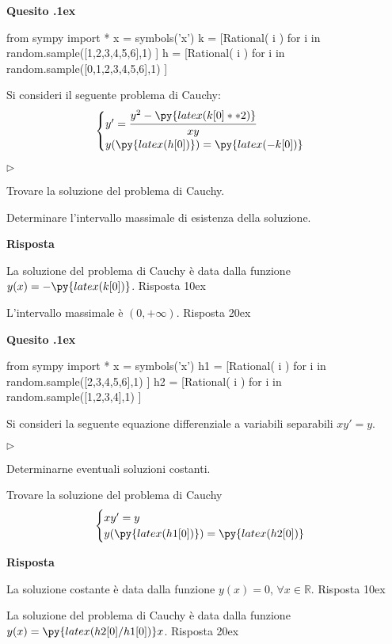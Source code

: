 \documentclass[11pt,twoside,a4paper]{article}
\newcommand{\mylabel}[1]{#1\hfill}
\renewenvironment{itemize}
  {\begin{list}{$\triangleright$}{%
   \setlength{\parskip}{0mm}
   \setlength{\topsep}{.4\baselineskip}
   \setlength{\rightmargin}{0mm}
   \setlength{\listparindent}{0mm}
   \setlength{\itemindent}{0mm}
   \setlength{\labelwidth}{2ex}
   \setlength{\itemsep}{.4\baselineskip}
   \setlength{\parsep}{0mm}
   \setlength{\partopsep}{0mm}
   \setlength{\labelsep}{1ex}
   \setlength{\leftmargin}{\labelwidth+\labelsep}
   \let\makelabel\mylabel}}{%
   \end{list}\vspace*{-1.3mm}}
\newcounter{quesito}
\newenvironment{question}{\bigskip\addtocounter{quesito}{1}\bigskip\bigskip\par\textbf{Quesito \thequesito.\kern1ex}}{\vspace{\parskip}}
\newenvironment{answer}{\par\textbf{Risposta\quad}}{\vspace{\parskip}}
\begin{document}
\begin{question}
\def\RR{{\mathds R}}
\begin{pycode}
from sympy import *
x = symbols('x')
k = [Rational( i ) for i in random.sample([1,2,3,4,5,6],1) ]
h = [Rational( i ) for i in random.sample([0,1,2,3,4,5,6],1) ]
\end{pycode}
Si consideri il seguente problema di Cauchy:
\[\begin{cases} y' = \cfrac{y^2 - \py{latex(k[0]**2)}}{xy} \cr y(\py{latex(h[0])}) = \py{latex(-k[0])} \end{cases}\]
\begin{itemize}
\item[1.] Trovare la soluzione del problema di Cauchy.
\item[2.] Determinare l'intervallo massimale di esistenza della soluzione.

\end{itemize}
\begin{answer}

{\color{blue}
La soluzione del problema di Cauchy \`e data dalla funzione $y(x) = -\py{latex(k[0])}$.
\hfill Risposta 1\kern0ex}

\smallskip
{\color{blue} L'intervallo massimale \`e $(0, +\infty)$.
\hfill Risposta 2\kern0ex}

\end{answer}
\end{question}
\begin{question}
\def\RR{{\mathds R}}
\begin{pycode}
from sympy import *
x = symbols('x')
h1 = [Rational( i ) for i in random.sample([2,3,4,5,6],1) ]
h2 = [Rational( i ) for i in random.sample([1,2,3,4],1) ]
\end{pycode}
Si consideri la seguente equazione differenziale a variabili separabili \(xy' = y\).
\begin{itemize}
\item[1.] Determinarne eventuali soluzioni costanti.
\item[2.] Trovare la soluzione del problema di Cauchy
\[\begin{cases} xy' = y \cr y(\py{latex(h1[0])}) = \py{latex(h2[0])}  \end{cases}\]
\end{itemize}
\begin{answer}

{\color{blue}
La soluzione costante \`e data dalla funzione $y(x) = 0$, $\forall x \in \RR$.
\hfill Risposta 1\kern0ex}

\smallskip
{\color{blue} La soluzione del problema di Cauchy \`e data dalla funzione $y(x) = \py{latex(h2[0]/h1[0])}x$.
\hfill Risposta 2\kern0ex}

\end{answer}
\end{question}
\end{document}
